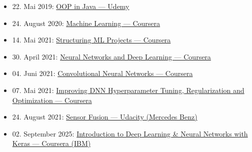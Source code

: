 \begin{itemize}[leftmargin=*]
  \item 22. Mai 2019: \href{https://www.udemy.com/certificate/UC-XN2ILPOB/}{OOP in Java — Udemy}
  \item 24. August 2020: \href{https://coursera.org/share/e32b80d8e0b32b48e4ad6fe40cea746e}{Machine Learning — Coursera}
  \item 14. Mai 2021: \href{https://coursera.org/share/15d74342746d2872a09dcc5a75ff460c}{Structuring ML Projects — Coursera}
  \item 30. April 2021: \href{https://coursera.org/share/0ca157f56b99f56122ab247589555837}{Neural Networks and Deep Learning — Coursera}
  \item 04. Juni 2021: \href{https://coursera.org/share/e0bd7b6ea301e1108dfe609c783f2706}{Convolutional Neural Networks — Coursera}
  \item 07. Mai 2021: \href{https://coursera.org/share/ef6671ff524b9d2e5c1e0e282d457f56}{Improving DNN Hyperparameter Tuning, Regularization and Optimization — Coursera}
  \item 24. August 2021: \href{http://www.udacity.com/certificate/e/95ce8498-c21f-11eb-aa1a-5f098308d726}{Sensor Fusion — Udacity (Mercedes Benz)}
  \item 02. September 2025: \href{https://coursera.org/share/a427d5fba5cb828a3b57e15ced4a7812}{Introduction to Deep Learning \& Neural Networks with Keras — Coursera (IBM)}
\end{itemize}     